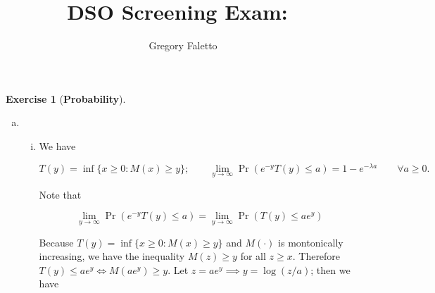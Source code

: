 \documentclass{article}
\title{
    \vspace{2in}
    \textmd{\textbf{DSO Screening Exam:\ \hmwkTitle}}\\
    \vspace{3in}
}
\author{Gregory Faletto}
\date{}
\theoremstyle{definition}
\newtheorem{exercise}{Exercise}
\theoremstyle{definition}
\theoremstyle{definition}
\theoremstyle{definition}
\theoremstyle{definition}
\begin{document}
\maketitle

\pagebreak


\begin{exercise}[\textbf{Probability}]

\begin{enumerate}[(a)]

\item 

\begin{enumerate}[(i)]

\item 


%
%
%
%
%
%
%

We have

\[
T(y) = \inf \{x \geq 0 : M(x) \geq y \}; \qquad \lim_{y \to \infty} \Pr \left( e^{-y} T(y) \leq a \right) = 1 - e^{-\lambda a} \qquad \forall a \geq 0.
\]

Note that

\[
 \lim_{y \to \infty} \Pr \left( e^{-y} T(y) \leq a \right) = \lim_{y \to \infty} \Pr(T(y) \leq a e^y) 
\]

Because \(T(y) = \inf \{x \geq 0 : M(x) \geq y \}\) and \(M(\cdot)\) is montonically increasing, we have the inequality \(M(z) \geq y\) for all \(z \geq x\). Therefore \(T(y) \leq ae^y \iff M(ae^y) \geq y\). Let \(z = ae^y \implies y = \log(z/a)\); then we have


\end{enumerate}
\end{enumerate}
\end{exercise}
\end{document}
